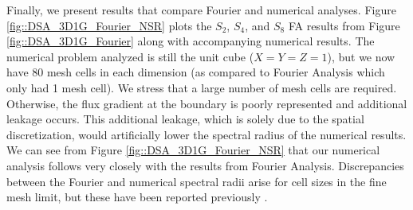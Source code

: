 Finally, we present results that compare Fourier and numerical analyses. Figure \ref{fig::DSA_3D1G_Fourier_NSR} plots the $S_2$, $S_4$, and $S_8$ FA results from Figure \ref{fig::DSA_3D1G_Fourier} along with accompanying numerical results. The numerical problem analyzed is still the unit cube ($X=Y=Z=1$), but we now have 80 mesh cells in each dimension (as compared to Fourier Analysis which only had 1 mesh cell). We stress that a large number of mesh cells are required. Otherwise, the flux gradient at the boundary is poorly represented and additional leakage occurs. This additional leakage, which is solely due to the spatial discretization, would artificially lower the spectral radius of the numerical results. We can see from Figure \ref{fig::DSA_3D1G_Fourier_NSR} that our numerical analysis follows very closely with the results from Fourier Analysis. Discrepancies between the Fourier and numerical spectral radii arise for cell sizes in the fine mesh limit, but these have been reported previously \cite{ref::DSA_wang_ragusa}.

